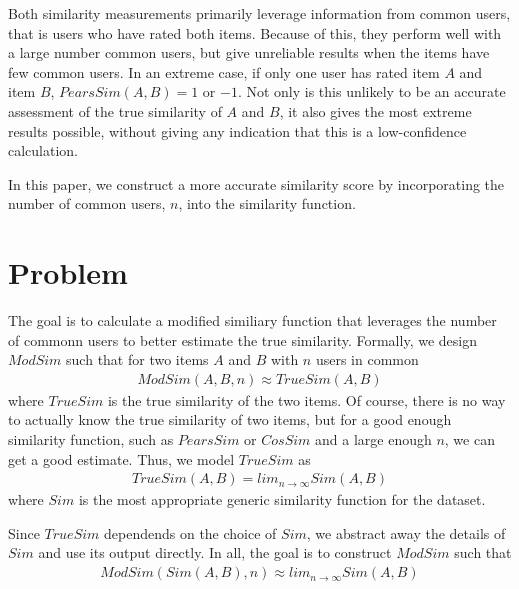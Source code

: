 \documentclass[10pt]{article}
\begin{document}

Both similarity measurements primarily leverage information from common users,
that is users who have rated both items. Because of this, they perform
well with a large number common users, but give unreliable results when the
items have few common users. In an extreme case, if only one user has rated item
$A$ and item $B$, $PearsSim(A, B) = 1$ or $-1$. Not only is this unlikely to be an accurate
assessment of the true similarity of $A$ and $B$, it also gives the most extreme
results possible, without giving any indication that this is a low-confidence
calculation.

In this paper, we construct a more accurate similarity score by incorporating the
number of common users, $n$, into the similarity function. 

\section*{Problem}
The goal is to calculate a modified similiary function that leverages the number of
commonn users to better estimate the true similarity. Formally, we design
$ModSim$ such that for two items $A$ and $B$ with $n$ users in common
\begin{align}
ModSim(A, B, n) \approx TrueSim(A, B)
\end{align}
where $TrueSim$ is the true similarity of the two items. Of course, there is no
way to actually know the true similarity of two items, but for a good enough
similarity function, such as $PearsSim$ or $CosSim$ and a large enough $n$, we
can get a good estimate. Thus, we model $TrueSim$ as 
\begin{align}
TrueSim(A, B) = lim_{n\to\infty}Sim(A, B)
\end{align}
where $Sim$ is the most appropriate generic similarity function for the dataset.

Since $TrueSim$ dependends on the choice of $Sim$, we abstract away the details
of $Sim$ and use its output directly. In all, the goal is to construct $ModSim$ such that
\begin{align}
ModSim(Sim(A, B), n) \approx lim_{n\to\infty}Sim(A, B)
\end{align}
\end{document}
